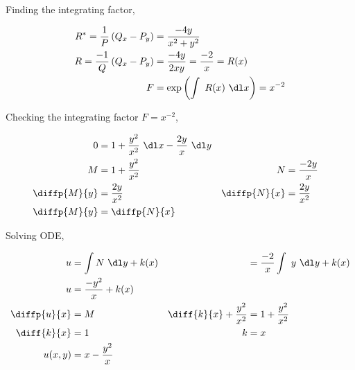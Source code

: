 \begin{enumerate}
          Finding the integrating factor,

          \begin{align}
              R^{*} = \frac{1}{P} \left( Q_{x} - P_{y}
              \right) & = \frac{-4y}{x^{2} + y^{2}}                      \\
              R = \frac{-1}{Q}\left( Q_{x} - P_{y}
              \right) & = \frac{-4y}{2xy} = \frac{-2}{x}  = R(x)         \\
              F       & = \exp \left( \int\ R(x)\ \dl x \right) = x^{-2}
          \end{align}

          Checking the integrating factor $ F = x^{-2} $,

          \begin{align}
              0            & = 1 + \frac{y^{2}}{x^{2}}\ \dl x - \frac{2y}{x}\ \dl y   \\
              M            & = 1 + \frac{y^{2}}{x^{2}}                              &
              N            & = \frac{-2y}{x}                                          \\
              \diffp{M}{y} & = \frac{2y}{x^{2}}                                     &
              \diffp{N}{x} & = \frac{2y}{x^{2}}                                       \\
              \diffp{M}{y} & = \diffp{N}{x}
          \end{align}

          Solving ODE,

          \begin{align}
              u                                 & = \int N\ \dl y+ k(x)         &
                                                & = \frac{-2}{x} \int\ y\ \dl y
              + k(x)                                                              \\
              u                                 & = \frac{-y^{2}}{x} + k(x)       \\
              \diffp{u}{x}                      & = M                           &
              \diff{k}{x} + \frac{y^{2}}{x^{2}} & =  1 + \frac{y^{2}}{x^{2}}      \\
              \diff{k}{x}                       & = 1                           &
              k                                 & = x                             \\
              u(x, y)                           & = x - \frac{y^{2}}{x}
          \end{align}



\end{enumerate}
